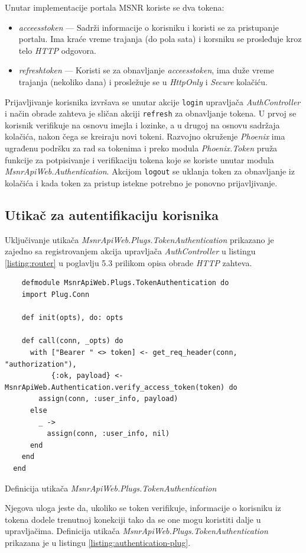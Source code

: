 \documentclass[12pt,oneside]{memoir}
\begin{document}
Unutar implementacije portala MSNR koriste se dva tokena: \begin{itemize}
\item \emph{acceess{\textunderscore}token} --- Sadrži informacije o korisniku i koristi se za pristupanje portalu. Ima kraće vreme trajanja (do pola sata) i korsniku se prosleđuje kroz telo \emph{HTTP} odgovora.
\item \emph{refresh{\textunderscore}token} --- Koristi se za obnavljanje \emph{acceess{\textunderscore}token}, ima duže vreme trajanja (nekoliko dana) i prosležuje se u \emph{HttpOnly} i \emph{Secure} kolačiću.  
\end{itemize}

Prijavljivanje korisnika izvršava se unutar akcije \texttt{login} upravljača \emph{AuthController} i
način obrade zahteva je sličan akciji \texttt{refresh} za obnavljanje tokena. U prvoj se
korisnik verifikuje na osnovu imejla i lozinke, a u drugoj na osnovu sadržaja kolačića, nakon čega se kreiraju novi tokeni.
Razvojno okruženje \emph{Phoenix} ima ugrađenu podršku za rad sa tokenima i preko modula \emph{Phoenix.Token}
pruža funkcije za potpisivanje i verifikaciju tokena koje se koriste unutar modula \emph{MsnrApiWeb.Authentication}.
Akcijom \texttt{logout} se uklanja token za obnavljanje iz kolačića i kada token za pristup istekne potrebno je ponovno prijavljivanje. 

\subsection{Utikač za autentifikaciju korisnika}
Uključivanje utikača \emph{MsnrApiWeb.Plugs.TokenAuthentication} prikazano je zajedno sa registrovanjem akcija upravljača
\emph{AuthController} u listingu \ref{listing:router} u poglavlju 5.3 prilikom opisa obrade \emph{HTTP} zahteva.
\begin{listing}[h!]
  \begin{verbatim}
    defmodule MsnrApiWeb.Plugs.TokenAuthentication do
    import Plug.Conn
  
    def init(opts), do: opts
  
    def call(conn, _opts) do
      with ["Bearer " <> token] <- get_req_header(conn, "authorization"),
           {:ok, payload} <- MsnrApiWeb.Authentication.verify_access_token(token) do
        assign(conn, :user_info, payload)
      else
        _ ->
          assign(conn, :user_info, nil)
      end
    end
  end
\end{verbatim}
\caption{Definicija utikača \emph{MsnrApiWeb.Plugs.TokenAuthentication}}
\label{listing:authentication-plug}
\end{listing}
Njegova uloga jeste da, ukoliko se token verifikuje, informacije o korisniku iz tokena dodele trenutnoj konekciji tako
da se one mogu koristiti dalje u upravljačima. Definicija utikača \emph{MsnrApiWeb.Plugs.TokenAuthentication} prikazana je u
listingu \ref{listing:authentication-plug}.
\end{document}
